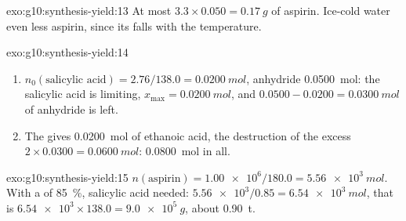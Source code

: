 \begin{solution}{exo:g10:synthesis-yield:13}
At most $3.3 \times 0.050 = \qty{0.17}{g}$ of aspirin. Ice-cold water
 even less aspirin, since its  falls with the
temperature.
\end{solution}

\begin{solution}{exo:g10:synthesis-yield:14}
\begin{enumerate}
  \item $n_0(\text{salicylic acid}) = 2.76 / 138.0 = \qty{0.0200}{mol}$,
        anhydride \qty{0.0500}{mol}: the salicylic acid is limiting,
        $x_{\max} = \qty{0.0200}{mol}$, and $0.0500 - 0.0200 =
        \qty{0.0300}{mol}$ of anhydride is left.
  \item The  gives \qty{0.0200}{mol} of ethanoic acid, the
        destruction of the excess $2 \times 0.0300 = \qty{0.0600}{mol}$:
        \qty{0.0800}{mol} in all.
\end{enumerate}
\end{solution}

\begin{solution}{exo:g10:synthesis-yield:15}
$n(\text{aspirin}) = \num{1.00e6} / 180.0 = \qty{5.56e3}{mol}$. With a
 of \qty{85}{\percent}, salicylic acid needed:
$\num{5.56e3} / 0.85 = \qty{6.54e3}{mol}$, that is
$\num{6.54e3} \times 138.0 = \qty{9.0e5}{g}$, about \qty{0.90}{t}.
\end{solution}

